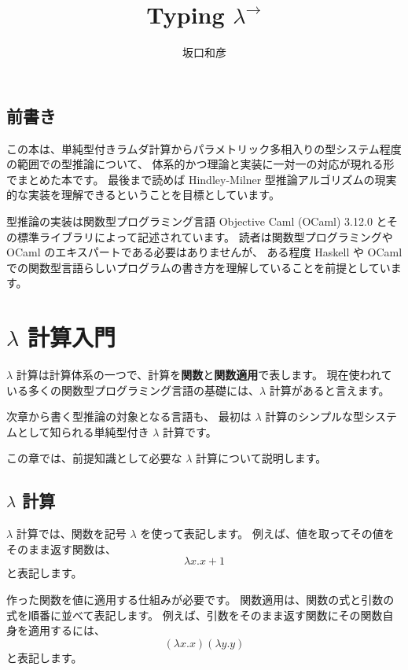 \documentclass[b5paper]{jsbook}
\title{Typing $\lambda^\to$}
\author{坂口和彦}
\begin{document}
\maketitle


\section*{前書き}

この本は、単純型付きラムダ計算からパラメトリック多相入りの型システム程度の範囲での型推論について、
体系的かつ理論と実装に一対一の対応が現れる形でまとめた本です。
最後まで読めば Hindley-Milner 型推論アルゴリズムの現実的な実装を理解できるということを目標としています。

型推論の実装は関数型プログラミング言語 Objective Caml (OCaml) 3.12.0
とその標準ライブラリによって記述されています。
読者は関数型プログラミングや OCaml のエキスパートである必要はありませんが、
ある程度 Haskell や OCaml での関数型言語らしいプログラムの書き方を理解していることを前提としています。

\tableofcontents
\newpage
{}

\chapter{$\lambda$ 計算入門}

$\lambda$ 計算は計算体系の一つで、計算を\textbf{関数}と\textbf{関数適用}で表します。
現在使われている多くの関数型プログラミング言語の基礎には、$\lambda$ 計算があると言えます。

次章から書く型推論の対象となる言語も、
最初は $\lambda$ 計算のシンプルな型システムとして知られる単純型付き $\lambda$ 計算です。

この章では、前提知識として必要な $\lambda$ 計算について説明します。

\section{$\lambda$ 計算}

$\lambda$ 計算では、関数を記号 $\lambda$ を使って表記します。
例えば、値を取ってその値をそのまま返す関数は、 \[ \lambda x. x+1 \] と表記します。

作った関数を値に適用する仕組みが必要です。
関数適用は、関数の式と引数の式を順番に並べて表記します。
例えば、引数をそのまま返す関数にその関数自身を適用するには、
\[ (\lambda x. x) (\lambda y. y) \] と表記します。
\end{document}
